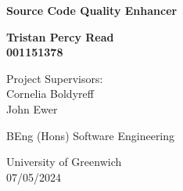 



\begin{titlepage}
    \begin{center}
        \vspace*{1cm}
            
        \Huge
        \textbf{Source Code Quality Enhancer}
            
            
        \vspace{1.5cm}
            
        \textbf{Tristan Percy Read\\001151378}

        \vspace{0.8cm}
        Project Supervisors:\\
        Cornelia Boldyreff\\
        John Ewer
            
        \vfill
            
        BEng (Hons) Software Engineering
            
        \vspace{0.8cm}
            
        \Large
        University of Greenwich\\
        07/05/2024
    \end{center}
\end{titlepage}
